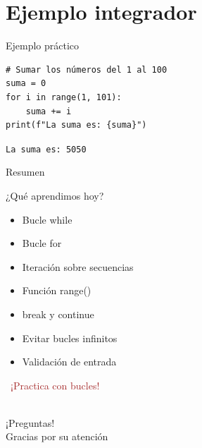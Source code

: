 \documentclass{beamer}
\begin{document}
\section{Ejemplo integrador}

\begin{frame}[fragile]{Ejemplo práctico \faUserCog}
\begin{lstlisting}
# Sumar los números del 1 al 100
suma = 0
for i in range(1, 101):
    suma += i
print(f"La suma es: {suma}")
\end{lstlisting}

\vspace{-0.2cm}
\begin{tcolorbox}[colback=green!10,colframe=green,title={\small\faArrowCircleRight \ Salida},coltitle=fg0,left=3pt,right=3pt,top=2pt,bottom=2pt,boxsep=1pt]
\small\texttt{La suma es: 5050}
\end{tcolorbox}
\end{frame}

\begin{frame}{Resumen \faListUl}
\begin{conceptbox}{¿Qué aprendimos hoy?}
\small
\begin{itemize}
    \item[\faCheck] Bucle while
    \item[\faCheck] Bucle for
    \item[\faCheck] Iteración sobre secuencias
    \item[\faCheck] Función range()
    \item[\faCheck] break y continue
    \item[\faCheck] Evitar bucles infinitos
    \item[\faCheck] Validación de entrada
\end{itemize}
\end{conceptbox}

\vspace{0.3cm}
\begin{center}
\large\textcolor{brown}{\faCode\ ¡Practica con bucles!}
\end{center}
\end{frame}

\begin{frame}
\begin{center}
\Huge\textcolor{brown}{\faQuestionCircle}\\
\vspace{0.5cm}
\Huge ¡Preguntas!\\
\vspace{1cm}
\Large\textcolor{brownbright}{Gracias por su atención}
\end{center}
\end{frame}
\end{document}
